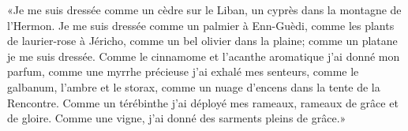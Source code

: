 «Je me suis dressée comme un cèdre sur le Liban,
	un cyprès dans la montagne de l’Hermon.
Je me suis dressée comme un palmier à Enn-Guèdi,
	comme les plants de laurier-rose à Jéricho,
	comme un bel olivier dans la plaine;
	comme un platane je me suis dressée.
Comme le cinnamome et l’acanthe aromatique j’ai donné mon parfum,
	comme une myrrhe précieuse j’ai exhalé mes senteurs,
	comme le galbanum, l’ambre et le storax,
	comme un nuage d’encens dans la tente de la Rencontre.
Comme un térébinthe j’ai déployé mes rameaux,
	rameaux de grâce et de gloire.
Comme une vigne, j’ai donné des sarments pleins de grâce.»
